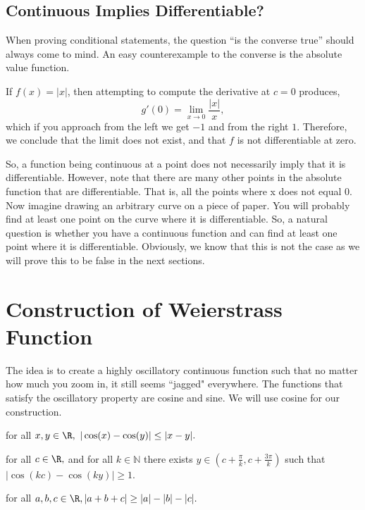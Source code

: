 \documentclass[fontsize=14pt]{scrartcl}
\begin{document}
\subsection*{Continuous Implies Differentiable?}
When proving conditional statements, the question ``is the converse true'' should always come to mind. An easy counterexample to the converse is the absolute value function.
\begin{example}
    If $f(x) = |x|$, then attempting to compute the derivative at $c=0$ produces,
    \[g'(0)=\lim_{x \to 0} \frac{|x|}{x},\]
    which if you approach from the left we get $-1$ and from the right $1$. Therefore, we conclude that the limit does not exist, and that $f$ is not differentiable at zero. \cite{Abbott2015}
\end{example}
So, a function being continuous at a point does not necessarily imply that it is differentiable. However, note that there are many other points in the absolute function that are differentiable. That is, all the points where x does not equal 0. Now imagine drawing an arbitrary curve on a piece of paper. You will probably find at least one point on the curve where it is differentiable. So, a natural question is whether you have a continuous function and can find at least one point where it is differentiable. Obviously, we know that this is not the case as we will prove this to be false in the next sections.


\newpage
\section{Construction of Weierstrass Function}
The idea is to create a highly oscillatory continuous function such that no matter how much you zoom in, it still seems ``jagged" everywhere. The functions that satisfy the oscillatory property are cosine and sine. We will use cosine for our construction.

\begin{theorem}
    for all $x,y \in \R, \ |\cos(x)-\cos(y)| \leq |x-y|.$
\end{theorem}

\begin{theorem}
    for all $c \in \R,$ and for all $ k \in \mathbb{N}$ there exists $y \in (c+\frac{\pi}{k}, c+\frac{3\pi}{k})$ such that $|\cos(kc) - \cos(ky)| \geq 1.$
\end{theorem}

\begin{theorem}
    for all $a,b,c \in \R, |a+b+c| \geq |a|-|b|-|c|.$ 
\end{theorem}
\end{document}
